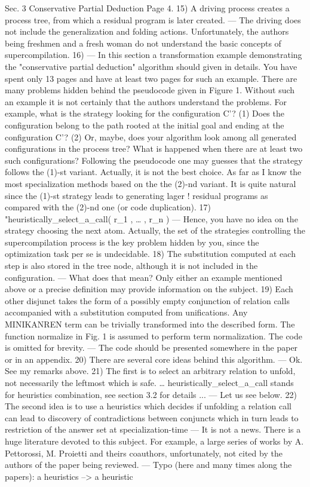 Sec. 3 Conservative Partial Deduction
Page 4.
15) A driving process creates a process tree, from which a residual program is later created.
 --- The driving does not include the generalization and folding actions. Unfortunately, the authors being freshmen and a fresh woman do not understand the basic concepts of supercompilation.
16) --- In this section a transformation example demonstrating the "conservative partial deduction" algorithm should given in details. You have spent only 13 pages and have at least two pages for such an example.  There are many problems hidden behind the pseudocode given in Figure 1. Without such an example it is not certainly that the authors understand the problems. For example, what is the strategy looking for the configuration C'? (1) Does the configuration belong to the path rooted at the initial goal and ending at the configuration C'? (2) Or, maybe, does your algorithm look among all generated configurations in the process tree? What is happened when there are at least two such configurations? Following the pseudocode one may guesses that the strategy follows the (1)-st variant. Actually, it is not the best choice. As far as I know the most specialization methods based on the the (2)-nd variant. It is quite natural since the (1)-st strategy leads to generating lager !
 residual programs as compared with the (2)-nd one (or code duplication).
17) "heuristically_select_a_call( r_1 , … , r_n )
 --- Hence, you have no idea on the strategy choosing the next atom. Actually, the set of the strategies controlling the supercompilation process is the key problem hidden by you, since the optimization task per se is undecidable.
18) The substitution computed at each step is also stored in the tree node, although it is not included in the configuration.
 --- What does that mean? Only either an example mentioned above or a precise definition may provide information on the subject.
19) Each other disjunct takes the form of a possibly empty conjunction of relation calls accompanied with a substitution computed from unifications. Any MINIKANREN term can be trivially transformed into the described form. The function normalize in Fig. 1 is assumed to perform term normalization. The code is omitted for brevity.
 --- The code should be presented somewhere in the paper or in an appendix.
20) There are several core ideas behind this algorithm.
 --- Ok. See my remarks above.
21) The first is to select an arbitrary relation to unfold, not necessarily the leftmost which is safe. … heuristically_select_a_call stands for heuristics combination, see section 3.2 for details ...
 --- Let us see below.
22) The second idea is to use a heuristics which decides if unfolding a relation call can lead to discovery of contradictions between conjuncts which in turn leads to restriction of the answer set at specialization-time
 --- It is not a news. There is a huge literature devoted to this subject. For example, a large series of works by A. Pettorossi, M. Proietti and theirs coauthors, unfortunately, not cited by the authors of the paper being reviewed.
 --- Typo (here and many times along the papers): a heuristics --> a heuristic

